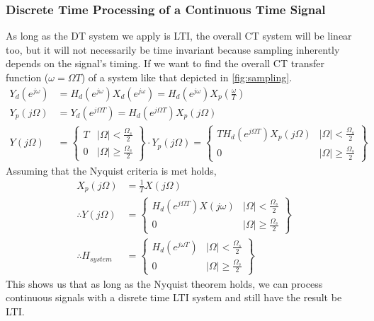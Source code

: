 \subsubsection{Discrete Time Processing of a Continuous Time Signal}
As long as the DT system we apply is LTI, the overall CT system will be linear too, but it will not necessarily be time invariant because sampling inherently depends on the signal's timing.
If we want to find the overall CT transfer function ($\omega = \Omega T$) of a system like that depicted in \cref{fig:sampling}.
\begin{align*}
    Y_d(e^{j\omega}) &= H_d(e^{j\omega})X_d(e^{j\omega}) = H_d(e^{j\omega})X_p\left(\frac{\omega}{T}\right)\\
    Y_p(j\Omega) &= Y_d(e^{j\Omega T}) = H_d(e^{j\Omega T})X_p(j\Omega)\\
    Y(j\Omega) &= \left\{
        \begin{array}{cc}
            T & |\Omega| < \frac{\Omega_s}{2}\\
            0 & |\Omega| \ge \frac{\Omega_s}{2}
        \end{array}
        \right\} \cdot Y_p(j\Omega) = \left\{
            \begin{array}{cc}
                TH_d(e^{j\Omega T})X_p(j\Omega) & |\Omega| < \frac{\Omega_s}{2}\\
                0 & |\Omega| \ge \frac{\Omega_s}{2}
            \end{array}
            \right\}
\end{align*}
Assuming that the Nyquist criteria is met holds,
\begin{align*}
    X_p(j\Omega) &= \frac{1}{T}X(j\Omega)\\
    \therefore Y(j\Omega) &= \left\{
        \begin{array}{cc}
            H_d(e^{j\Omega T})X(j\omega) & |\Omega| < \frac{\Omega_s}{2}\\
            0 & |\Omega| \ge \frac{\Omega_s}{2}
        \end{array}
    \right\}\\
        \therefore H_{system} &= \left\{\begin{array}{cc}
            H_d(e^{j\omega T}) & |\Omega| < \frac{\Omega_s}{2}\\
            0 & |\Omega| \ge \frac{\Omega_s}{2}
        \end{array}
        \right\}
\end{align*}
This shows us that as long as the Nyquist theorem holds, we can process continuous signals with a disrete time LTI system and still have the result be LTI.
